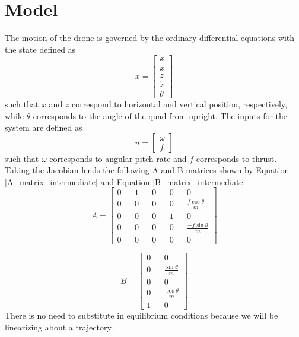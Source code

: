 \documentclass[12pt]{article}
\begin{document}
	\section{Model}
	The motion of the drone is governed by the ordinary differential equations with the state defined as
	\begin{equation}
	\label{state}
	x = \begin{bmatrix} x\\ \dot{x} \\ z \\ \dot{z} \\ \theta \end{bmatrix}
	\end{equation}
	such that $x$ and $z$ correspond to horizontal and vertical position, respectively, while $\theta$ corresponds to the angle of the quad from upright. The inputs for the system are defined as
	\begin{equation}
	\label{inputs}
	u = \begin{bmatrix} \omega \\ f \end{bmatrix}
	\end{equation}
	such that $\omega$ corresponds to angular pitch rate and $f$ corresponds to thrust. Taking the Jacobian lends the following A and B matrices shown by Equation \ref{A_matrix_intermediate} and Equation \ref{B_matrix_intermediate}
	\begin{equation}
	\label{A_matrix_intermediate}
	A = \begin{bmatrix} 0 && 1 && 0 && 0 && 0 \\ 0 && 0 && 0 && 0 && \frac{f\cos{\theta}}{m} \\  0 && 0 && 0 && 1 && 0 \\ 0 && 0 && 0 && 0 && \frac{-f\sin{\theta}}{m} \\ 0 && 0 && 0 && 0 && 0 \end{bmatrix}
	\end{equation}
	
	\begin{equation}
	\label{B_matrix_intermediate}
	B = \begin{bmatrix} 0 && 0 \\ 0 && \frac{\sin{\theta}}{m} \\ 0 && 0 \\ 0 && \frac{\cos{\theta}}{m} \\ 1 && 0 \end{bmatrix}
	\end{equation}
	There is no need to substitute in equilibrium conditions because we will be linearizing about a trajectory.
	
\end{document}
